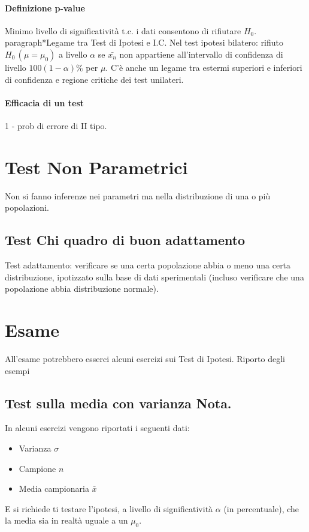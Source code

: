 \paragraph*{Definizione p-value} Minimo livello di significatività t.c. i dati
consentono di rifiutare $H_0$.
\\paragraph*{Legame tra Test di Ipotesi e I.C.}
Nel test ipotesi bilatero: rifiuto $H_0 \, (\mu=\mu_0)$ a livello $\alpha$ se $\bar{x_n}$
non appartiene all'intervallo di confidenza di livello $100(1-\alpha)\%$ per $\mu$.
C'è anche un legame tra estermi superiori e inferiori di confidenza e regione critiche dei
test unilateri.
\paragraph*{Efficacia di un test} 1 - prob di errore di II tipo.

\section*{Test Non Parametrici} Non si fanno inferenze nei parametri ma nella
distribuzione di una o più popolazioni.
\subsection{Test Chi quadro di buon adattamento}
Test adattamento: verificare se una certa popolazione abbia o meno una certa distribuzione,
ipotizzato sulla base di dati sperimentali (incluso verificare che una popolazione
abbia distribuzione normale).



\section{Esame}
All'esame potrebbero esserci alcuni esercizi sui Test di Ipotesi. Riporto degli esempi

\subsection{Test sulla media con varianza Nota.}
In alcuni esercizi vengono riportati i seguenti dati:
\begin{itemize}
    \item Varianza $\sigma$
    \item Campione $n$
    \item Media campionaria $\bar{x}$
\end{itemize}
E si richiede ti testare l'ipotesi, a livello di significatività $\alpha$ (in percentuale), che la media sia in realtà uguale a un $\mu_0$.
